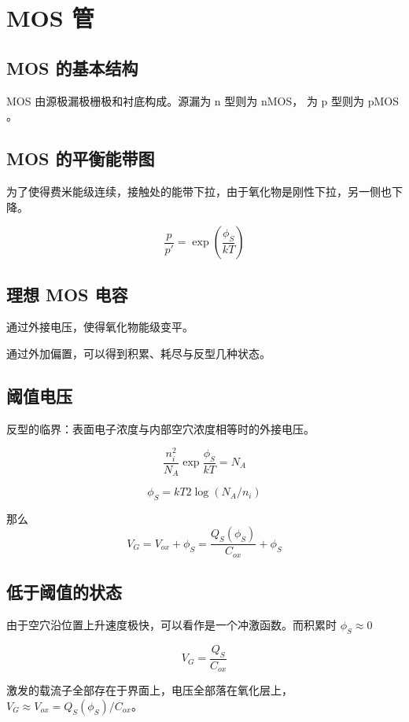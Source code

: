 \documentclass[cn,11pt,chinese,black,simple]{../elegantbook}
\begin{document}
\fi 
\def\chapname{04mos}

\chapter{MOS 管}


\section{MOS 的基本结构}

MOS 由源极漏极栅极和衬底构成。源漏为 n 型则为 nMOS， 为 p 型则为 pMOS 。

\section{MOS 的平衡能带图}

为了使得费米能级连续，接触处的能带下拉，由于氧化物是刚性下拉，另一侧也下降。

\[\frac{p}{p'} = \exp(\frac{\phi_S}{kT})\] 


\section{理想 MOS 电容}

通过外接电压，使得氧化物能级变平。

通过外加偏置，可以得到积累、耗尽与反型几种状态。

\section{阈值电压}

反型的临界：表面电子浓度与内部空穴浓度相等时的外接电压。

\[\frac{n_i^2}{N_A}\exp \frac{\phi_S}{k T} = N_A\] 

\[\phi_S = k T 2 \log (N_A/n_i)\]

那么 \[V_G = V_{ox} + \phi_S = \frac{Q_S(\phi_S)}{C_{ox}} + \phi_S\]

\section{低于阈值的状态}

由于空穴沿位置上升速度极快，可以看作是一个冲激函数。而积累时 \(\phi_S \approx 0\) 

\[V_G = \frac{Q_S}{C_{ox}}\]

激发的载流子全部存在于界面上，电压全部落在氧化层上，\(V_G \approx V_{ox} = Q_S(\phi_S)/C_{ox}\)。
\end{document}
